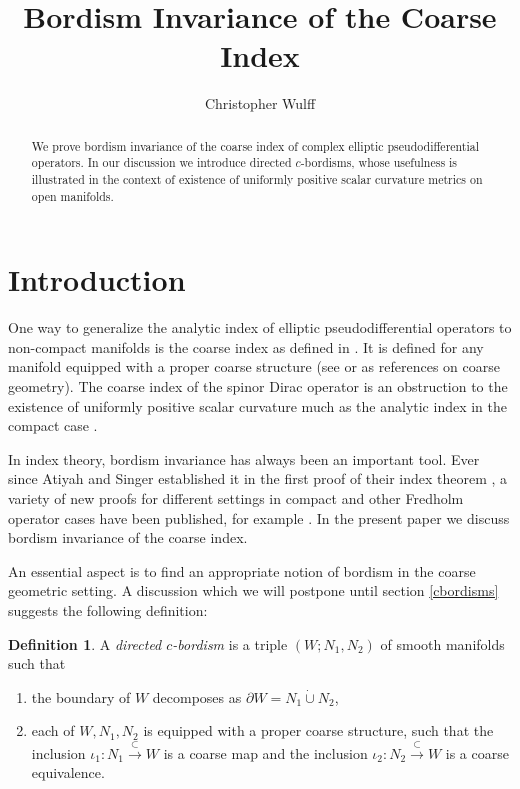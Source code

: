 \documentclass[a4paper]{amsproc}
\theoremstyle{definition}
\newtheorem{definition}[theorem]{Definition}
\theoremstyle{remark}
\numberwithin{equation}{section}
\begin{document}
\title{Bordism Invariance of the Coarse Index}

\author{Christopher Wulff}


\keywords{}

\date{}

\dedicatory{}

\begin{abstract}
We prove bordism invariance of the coarse index of complex elliptic
pseudodifferential operators.
In our discussion we introduce directed $c$-bordisms, whose usefulness is illustrated in the context of existence of uniformly positive scalar curvature metrics on open manifolds.
\end{abstract}

\maketitle

\section{Introduction}
One way to generalize the analytic index of elliptic pseudodifferential operators to
non-compact manifolds is the coarse index as defined in \cite[Chapter 12]{MR1817560}. It is defined for any manifold equipped with a
proper coarse structure (see \cite[Chapter 6]{MR1817560} or
\cite{MR2007488} as
references on coarse geometry).
The coarse index of the spinor Dirac operator is an obstruction to the existence of
uniformly positive scalar curvature much as the analytic index in the compact case \cite[Chapter 12]{MR1817560}.

In index theory, bordism invariance has always been an important
tool. Ever since Atiyah and Singer established it in the first proof of their index theorem \cite[Chapter XVII]{MR0198494}, a variety of new proofs for different settings in compact and other Fredholm operator cases have been published, for example
\cite{MR1113688,MR1231967,MR1402879,MR1873784,MR2139923,MR2274155,MR2231925}. In the present paper we discuss bordism invariance of the coarse index.

An essential aspect is to find an appropriate notion of bordism in the coarse geometric setting. A discussion which we will postpone until section \ref{cbordisms} suggests the following definition:
\begin{definition}\label{cbordism}
A \emph{directed $c$-bordism} is a triple $(W;N_1,N_2)$ of smooth
manifolds  such that
\begin{enumerate}
\item the boundary of $W$ decomposes as $\partial W=N_1\dot\cup N_2$, \item each of $W,N_1,N_2$ is equipped with a proper coarse structure, such that
the inclusion $\iota_1:N_1\xrightarrow{\subset}W$ is a coarse map and the inclusion
$\iota_2:N_2\xrightarrow{\subset}W$ is a coarse equivalence.
\end{enumerate}
\end{definition}
\end{document}
